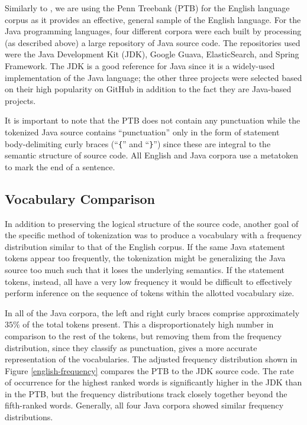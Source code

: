 \documentclass[runningheads,a4paper]{llncs}
\begin{document}
Similarly to \citet{LSTMArticle}, we are using the Penn Treebank (PTB) for the
English language corpus as it provides an effective, general sample of the English
language.
For the Java programming languages, four different corpora were each built
by processing (as described above) a large repository of Java source code. The
repositories used were
the Java Development Kit (JDK), Google Guava, ElasticSearch, and Spring Framework.
The JDK is a good reference for Java since it is a widely-used implementation
of the Java language; the other three projects were selected based on their
high popularity on GitHub in addition to the fact they are
Java-based projects.

It is important to note that the
PTB does not contain any punctuation while the tokenized
Java source contains ``punctuation'' only in the form of statement
body-delimiting curly braces (``\texttt\{'' and ``\texttt\}'')
since these are integral to the semantic structure of source code.
All English and Java corpora use a metatoken to mark the end of a sentence.

\subsection{Vocabulary Comparison}

In addition to preserving the logical structure of the source code,
another goal of the specific method of tokenization was to
produce a vocabulary with a frequency distribution similar to that of
the English corpus. If the same
Java statement tokens appear too frequently, the tokenization might be
generalizing the Java source too much such that it loses the underlying
semantics. If the statement tokens, instead, all have a very low frequency
it would be difficult to effectively perform inference on the sequence of 
tokens within the allotted vocabulary size.

In all of the Java corpora, the left and right curly braces comprise
approximately $35\%$
of the total tokens present. This a disproportionately high number in
comparison to the rest of the tokens, but removing them from the frequency
distribution, since they classify as punctuation, gives a more accurate
representation of the vocabularies. The adjusted frequency distribution
shown in Figure \ref{english-frequency} compares the PTB to the
JDK source code. The rate of occurrence for the highest
ranked words is significantly higher in the JDK than in the PTB, but
the frequency distributions track closely together beyond the fifth-ranked
words.
Generally, all four Java corpora showed similar frequency distributions.
\end{document}
